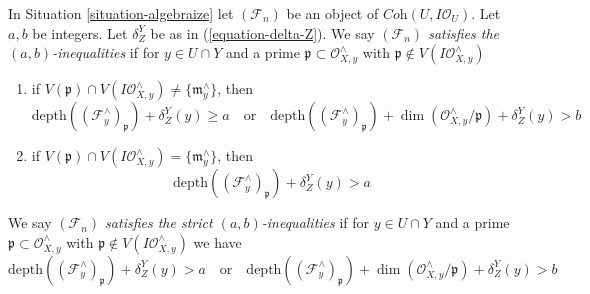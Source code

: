 \begin{definition}
\label{definition-s-d-inequalities}
In Situation \ref{situation-algebraize} let $(\mathcal{F}_n)$ be an object
of $\textit{Coh}(U, I\mathcal{O}_U)$. Let $a, b$ be integers.
Let $\delta^Y_Z$ be as in (\ref{equation-delta-Z}).
We say
{\it $(\mathcal{F}_n)$ satisfies the $(a, b)$-inequalities} if for
$y \in U \cap Y$ and a prime $\mathfrak p \subset \mathcal{O}_{X, y}^\wedge$
with $\mathfrak p \not \in V(I\mathcal{O}_{X, y}^\wedge)$
\begin{enumerate}
\item if $V(\mathfrak p) \cap V(I\mathcal{O}_{X, y}^\wedge) \not =
\{\mathfrak m_y^\wedge\}$, then
$$
\text{depth}((\mathcal{F}^\wedge_y)_\mathfrak p) + \delta^Y_Z(y) \geq a
\quad\text{or}\quad
\text{depth}((\mathcal{F}^\wedge_y)_\mathfrak p) +
\dim(\mathcal{O}_{X, y}^\wedge/\mathfrak p) + \delta^Y_Z(y) > b
$$
\item if $V(\mathfrak p) \cap V(I\mathcal{O}_{X, y}^\wedge) =
\{\mathfrak m_y^\wedge\}$, then
$$
\text{depth}((\mathcal{F}^\wedge_y)_\mathfrak p) + \delta^Y_Z(y) > a
$$
\end{enumerate}
We say {\it $(\mathcal{F}_n)$ satisfies the strict $(a, b)$-inequalities}
if for $y \in U \cap Y$ and a prime
$\mathfrak p \subset \mathcal{O}_{X, y}^\wedge$ with
$\mathfrak p \not \in V(I\mathcal{O}_{X, y}^\wedge)$
we have
$$
\text{depth}((\mathcal{F}^\wedge_y)_\mathfrak p) + \delta^Y_Z(y) > a
\quad\text{or}\quad
\text{depth}((\mathcal{F}^\wedge_y)_\mathfrak p) +
\dim(\mathcal{O}_{X, y}^\wedge/\mathfrak p) + \delta^Y_Z(y) > b
$$
\end{definition}